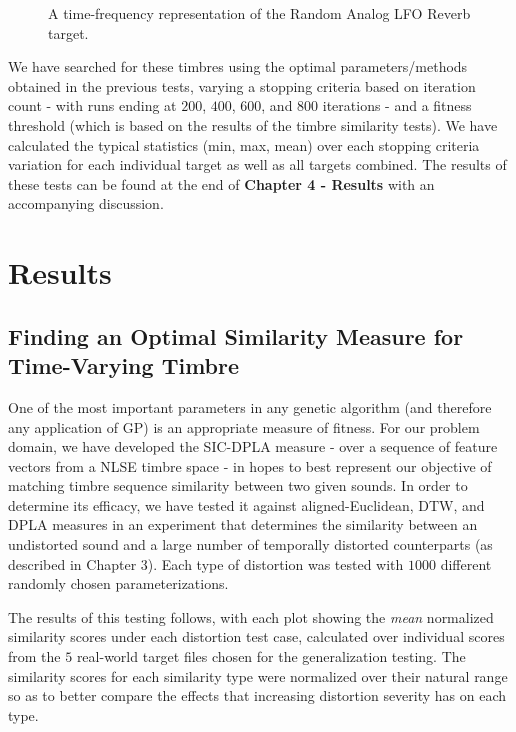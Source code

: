 \documentclass[a4paper,12pt]{report} 	%
\numberwithin{figure}{chapter}
\numberwithin{table}{chapter}
\numberwithin{equation}{chapter}
\begin{document}
\begin{flushleft}
\begin{figure}[h!]
\begin{center}
\caption[Random Analog LFO Reverb Time-Frequency Representation]{A time-frequency representation of the Random Analog LFO Reverb target.}
\end{center}
\end{figure}
We have searched for these timbres using the optimal parameters/methods obtained in the previous tests, varying a stopping criteria based on iteration count - with runs ending at $200$, $400$, $600$, and $800$ iterations - and a fitness threshold (which is based on the results of the timbre similarity tests). We have calculated the typical statistics (min, max, mean) over each stopping criteria variation for each individual target as well as all targets combined. The results of these tests can be found at the end of \textbf{Chapter 4 - Results} with an accompanying discussion.

\vspace*{\QuarterPage}
\chapter{Results} %
\section{Finding an Optimal Similarity Measure for Time-Varying Timbre}
One of the most important parameters in any genetic algorithm (and therefore any application of GP) is an appropriate measure of fitness. For our problem domain, we have developed the SIC-DPLA measure - over a sequence of feature vectors from a NLSE timbre space - in hopes to best represent our objective of matching timbre sequence similarity between two given sounds. In order to determine its efficacy, we have tested it against aligned-Euclidean, DTW, and DPLA measures in an experiment that determines the similarity between an undistorted sound and a large number of temporally distorted counterparts (as described in Chapter 3). Each type of distortion was tested with $1000$ different randomly chosen parameterizations.

The results of this testing follows, with each plot showing the \textit{mean} normalized similarity scores under each distortion test case, calculated over individual scores from the $5$ real-world target files chosen for the generalization testing. The similarity scores for each similarity type were normalized over their natural range so as to better compare the effects that increasing distortion severity has on each type.


\end{flushleft}
\end{document}
